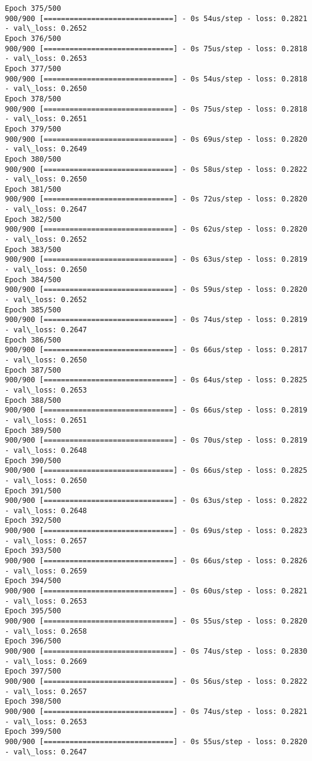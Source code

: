 \documentclass[11pt]{article}
\begin{document}
\begin{Verbatim}[commandchars=\\\{\}]
Epoch 375/500
900/900 [==============================] - 0s 54us/step - loss: 0.2821 - val\_loss: 0.2652
Epoch 376/500
900/900 [==============================] - 0s 75us/step - loss: 0.2818 - val\_loss: 0.2653
Epoch 377/500
900/900 [==============================] - 0s 54us/step - loss: 0.2818 - val\_loss: 0.2650
Epoch 378/500
900/900 [==============================] - 0s 75us/step - loss: 0.2818 - val\_loss: 0.2651
Epoch 379/500
900/900 [==============================] - 0s 69us/step - loss: 0.2820 - val\_loss: 0.2649
Epoch 380/500
900/900 [==============================] - 0s 58us/step - loss: 0.2822 - val\_loss: 0.2650
Epoch 381/500
900/900 [==============================] - 0s 72us/step - loss: 0.2820 - val\_loss: 0.2647
Epoch 382/500
900/900 [==============================] - 0s 62us/step - loss: 0.2820 - val\_loss: 0.2652
Epoch 383/500
900/900 [==============================] - 0s 63us/step - loss: 0.2819 - val\_loss: 0.2650
Epoch 384/500
900/900 [==============================] - 0s 59us/step - loss: 0.2820 - val\_loss: 0.2652
Epoch 385/500
900/900 [==============================] - 0s 74us/step - loss: 0.2819 - val\_loss: 0.2647
Epoch 386/500
900/900 [==============================] - 0s 66us/step - loss: 0.2817 - val\_loss: 0.2650
Epoch 387/500
900/900 [==============================] - 0s 64us/step - loss: 0.2825 - val\_loss: 0.2653
Epoch 388/500
900/900 [==============================] - 0s 66us/step - loss: 0.2819 - val\_loss: 0.2651
Epoch 389/500
900/900 [==============================] - 0s 70us/step - loss: 0.2819 - val\_loss: 0.2648
Epoch 390/500
900/900 [==============================] - 0s 66us/step - loss: 0.2825 - val\_loss: 0.2650
Epoch 391/500
900/900 [==============================] - 0s 63us/step - loss: 0.2822 - val\_loss: 0.2648
Epoch 392/500
900/900 [==============================] - 0s 69us/step - loss: 0.2823 - val\_loss: 0.2657
Epoch 393/500
900/900 [==============================] - 0s 66us/step - loss: 0.2826 - val\_loss: 0.2659
Epoch 394/500
900/900 [==============================] - 0s 60us/step - loss: 0.2821 - val\_loss: 0.2653
Epoch 395/500
900/900 [==============================] - 0s 55us/step - loss: 0.2820 - val\_loss: 0.2658
Epoch 396/500
900/900 [==============================] - 0s 74us/step - loss: 0.2830 - val\_loss: 0.2669
Epoch 397/500
900/900 [==============================] - 0s 56us/step - loss: 0.2822 - val\_loss: 0.2657
Epoch 398/500
900/900 [==============================] - 0s 74us/step - loss: 0.2821 - val\_loss: 0.2653
Epoch 399/500
900/900 [==============================] - 0s 55us/step - loss: 0.2820 - val\_loss: 0.2647

\end{Verbatim}
\end{document}
